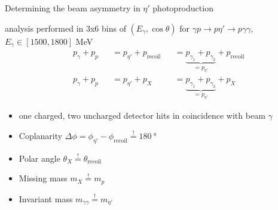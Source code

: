 \documentclass[11pt,aspectratio=169,dvipsnames]{beamer}
\newcommand{\thecolor}{black!70!blue}
\begin{document}
\begin{frame}{Determining the beam asymmetry in $\eta'$ photoproduction}
	\begin{tcolorbox}[colback=blue!5,colframe=\thecolor,title={Event selection ($\eta'$)}]
		analysis performed in 3x6 bins of $(E_\gamma,\cos\theta)$ for $\gamma p\to p\eta'\to p\gamma\gamma$,\\ $E_\gamma\in[1500,1800]$ MeV
		\vspace{-0.5cm}
		\begin{align*}
			&p_\gamma + p_p &&= p_{\eta'}+p_\text{recoil}& &=\underbrace{p_{\gamma_1}+p_{\gamma_2}}_{=p_{\eta'}}+p_\text{recoil}\\
			&p_\gamma + p_p &&= p_{\eta'}+p_X &&=\underbrace{p_{\gamma_1}+p_{\gamma_2}}_{=p_{\eta'}} + p_X
		\end{align*}
		\vspace{-0.7cm}
		\begin{itemize}
			\item one charged, two uncharged detector hits in coincidence with beam $\gamma$
			\item Coplanarity $\Delta\phi=\phi_{\eta'}-\phi_\text{recoil}\overset{!}{=}\SI{180}{\degree}$
			\item Polar angle $\theta_X\overset{!}{=}\theta_\text{recoil}$
			\item Missing mass $m_X\overset{!}{=}m_p$
			\item Invariant mass $m_{\gamma\gamma}\overset{!}{=}m_{\eta'}$
		\end{itemize}
	\end{tcolorbox}
\end{frame}
\end{document}
